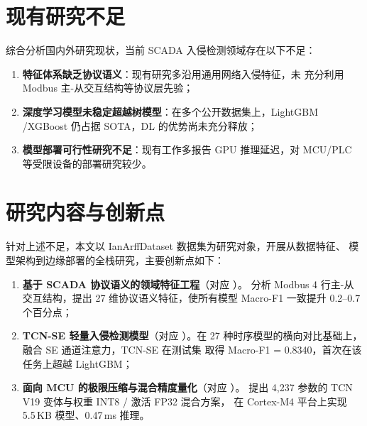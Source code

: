 
\section{现有研究不足}
\label{sec:gap}

\par 综合分析国内外研究现状，当前 SCADA 入侵检测领域存在以下不足：

\begin{enumerate}
  \item \textbf{特征体系缺乏协议语义}：现有研究多沿用通用网络入侵特征，未
        充分利用 Modbus 主-从交互结构等协议层先验；
  \item \textbf{深度学习模型未稳定超越树模型}：在多个公开数据集上，LightGBM
        /XGBoost 仍占据 SOTA，DL 的优势尚未充分释放；
  \item \textbf{模型部署可行性研究不足}：现有工作多报告 GPU 推理延迟，对
        MCU/PLC 等受限设备的部署研究较少。
\end{enumerate}


\section{研究内容与创新点}
\label{sec:contribution}

\par 针对上述不足，本文以 IanArffDataset 数据集为研究对象，开展从数据特征、
模型架构到边缘部署的全栈研究，主要创新点如下：

\begin{enumerate}
  \item \textbf{基于 SCADA 协议语义的领域特征工程}（对应 ）。
        分析 Modbus 4 行主-从交互结构，提出 27 维协议语义特征，使所有模型
        Macro-F1 一致提升 0.2--0.7 个百分点；
  \item \textbf{TCN-SE 轻量入侵检测模型}（对应 ）。在 27
        种时序模型的横向对比基础上，融合 SE 通道注意力，TCN-SE 在测试集
        取得 Macro-F1 = 0.8340，首次在该任务上超越 LightGBM；
  \item \textbf{面向 MCU 的极限压缩与混合精度量化}（对应 ）。
        提出 4{,}237 参数的 TCN V19 变体与权重 INT8 / 激活 FP32 混合方案，
        在 Cortex-M4 平台上实现 5.5\,KB 模型、0.47\,ms 推理。
\end{enumerate}

